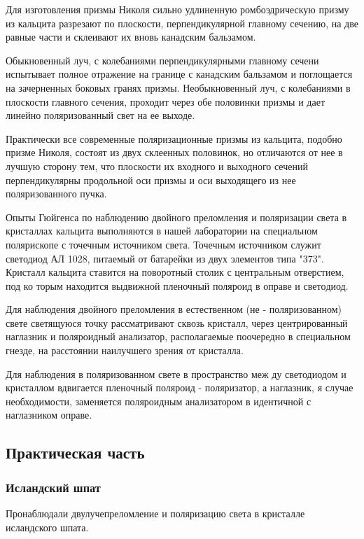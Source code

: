 Для изготовления призмы Николя сильно удлиненную ромбоэдрическую призму из кальцита разрезают по плоскости, перпендикулярной главному сечению, на две равные части и склеивают их вновь канадским бальзамом.

Обыкновенный луч, с колебаниями перпендикулярными главному сечени
испытывает полное отражение на границе с канадским бальзамом и
поглощается на зачерненных боковых гранях призмы. Необыкновенный
луч, с колебаниями в плоскости главного сечения, проходит через
обе половинки призмы и дает линейно поляризованный свет на ее
выходе.

Практически все современные поляризационные призмы из каль­цита, подобно призме Николя, состоят из двух склеенных половинок,
но отличаются от нее в лучшую сторону тем, что плоскости их входного и выходного сечений перпендикулярны продольной оси призмы
и оси выходящего из нее поляризованного пучка.

Опыты Гюйгенса по наблюдению двойного преломления и поля­ризации света в кристаллах кальцита выполняются в нашей лабора­тории на специальном полярископе с точечным источником
света. Точечным источником служит светодиод АЛ 1028, питаемый
от батарейки из двух элементов типа "373". Кристалл кальцита
ставится на поворотный столик с центральным отверстием, под ко­
торым находится выдвижной пленочный поляроид в оправе и свето­диод.

Для наблюдения двойного преломления в естественном (не -
поляризованном) свете светящуюся точку рассматривают сквозь
кристалл, через центрированный наглазник и поляроидный анализатор, располагаемые поочередно в специальном гнезде,
на расстоянии наилучшего зрения от кристалла.

Для наблюдения в поляризованном свете в пространство меж­
ду светодиодом и кристаллом вдвигается пленочный поляроид - поляризатор, а наглазник, я случае необходимости, заменяется поляроидным анализатором в идентичной с наглазником оправе.
\subsection{Практическая часть}
\subsubsection{Исландский шпат}

Пронаблюдали двулучепреломление и поляризацию света в кристалле исландского шпата. 

